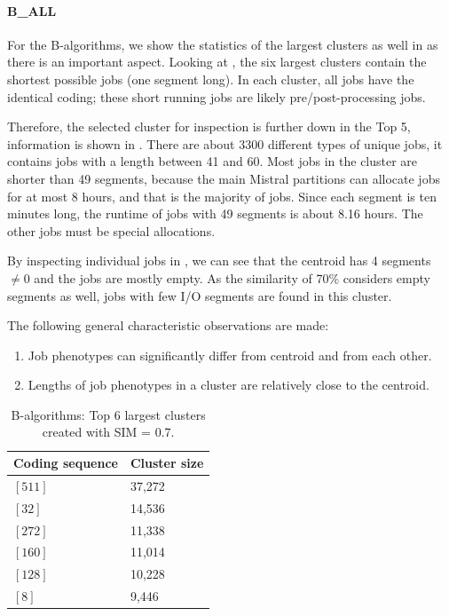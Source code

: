 \documentclass{jhps}
\begin{document}
\FloatBarrier
\paragraph{B\_ALL}
For the B-algorithms, we show the statistics of the largest clusters as well in  as there is an important aspect.
Looking at , the six largest clusters contain the shortest possible jobs (one segment long).
In each cluster, all jobs have the identical coding; these short running jobs are likely pre/post-processing jobs.

Therefore, the selected cluster for inspection is further down in the Top 5, information is shown in .
There are about 3300 different types of unique jobs, it contains jobs with a length between 41 and 60.
Most jobs in the cluster are shorter than 49 segments, because the main Mistral partitions can allocate jobs for at most 8 hours, and that is the majority of jobs.
Since each segment is ten minutes long, the runtime of jobs with 49 segments is about 8.16 hours.
The other jobs must be special allocations.

By inspecting individual jobs in , we can see that the centroid has 4 segments $\neq 0$ and the jobs are mostly empty.
As the similarity of 70\% considers empty segments as well, jobs with few I/O segments are found in this cluster.

The following general characteristic observations are made:
\begin{enumerate}
 \item Job phenotypes can significantly differ from centroid and from each other.
 \item Lengths of job phenotypes in a cluster are relatively close to the centroid.
\end{enumerate}

\begin{table}
	\centering
	\begin{tabular}{ll}
		Coding sequence & Cluster size \\
		\midrule
		$[511]$ & 37,272 \\
		$[32]$  & 14,536 \\
		$[272]$ & 11,338 \\
		$[160]$ & 11,014 \\
		$[128]$ & 10,228 \\
		$[8]$   & 9,446  \\
	\end{tabular}
	\caption{B-algorithms: Top 6 largest clusters created with SIM = 0.7.}
	\label{tab:bin:largest_clusters}
\end{table}
\end{document}
